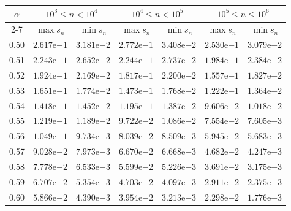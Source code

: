 \begin{table}[htb!]
\centering
\footnotesize
\begin{tabular}{|c|cc|cc|cc|}
\hline
\multirow{2}{*}{$\alpha$} & \multicolumn{2}{c|}{$10^{3} \leq n < 10^{4}$} & \multicolumn{2}{c|}{$10^{4} \leq n < 10^{5}$} & \multicolumn{2}{c|}{$10^{5} \leq n \leq 10^{6}$} \\
\cline{2-7}
 & $\max s_n$ & $\min s_n$ & $\max s_n$ & $\min s_n$ & $\max s_n$ & $\min s_n$ \\
\hline\hline
0.50 & $2.617\mathrm{e}{-1}$ & $3.181\mathrm{e}{-2}$ & $2.772\mathrm{e}{-1}$ & $3.408\mathrm{e}{-2}$ & $2.530\mathrm{e}{-1}$ & $3.079\mathrm{e}{-2}$ \\
0.51 & $2.243\mathrm{e}{-1}$ & $2.652\mathrm{e}{-2}$ & $2.244\mathrm{e}{-1}$ & $2.737\mathrm{e}{-2}$ & $1.984\mathrm{e}{-1}$ & $2.384\mathrm{e}{-2}$ \\
0.52 & $1.924\mathrm{e}{-1}$ & $2.169\mathrm{e}{-2}$ & $1.817\mathrm{e}{-1}$ & $2.200\mathrm{e}{-2}$ & $1.557\mathrm{e}{-1}$ & $1.827\mathrm{e}{-2}$ \\
0.53 & $1.651\mathrm{e}{-1}$ & $1.774\mathrm{e}{-2}$ & $1.473\mathrm{e}{-1}$ & $1.768\mathrm{e}{-2}$ & $1.222\mathrm{e}{-1}$ & $1.364\mathrm{e}{-2}$ \\
0.54 & $1.418\mathrm{e}{-1}$ & $1.452\mathrm{e}{-2}$ & $1.195\mathrm{e}{-1}$ & $1.387\mathrm{e}{-2}$ & $9.606\mathrm{e}{-2}$ & $1.018\mathrm{e}{-2}$ \\
0.55 & $1.219\mathrm{e}{-1}$ & $1.189\mathrm{e}{-2}$ & $9.722\mathrm{e}{-2}$ & $1.086\mathrm{e}{-2}$ & $7.554\mathrm{e}{-2}$ & $7.605\mathrm{e}{-3}$ \\
0.56 & $1.049\mathrm{e}{-1}$ & $9.734\mathrm{e}{-3}$ & $8.039\mathrm{e}{-2}$ & $8.509\mathrm{e}{-3}$ & $5.945\mathrm{e}{-2}$ & $5.683\mathrm{e}{-3}$ \\
0.57 & $9.028\mathrm{e}{-2}$ & $7.973\mathrm{e}{-3}$ & $6.670\mathrm{e}{-2}$ & $6.668\mathrm{e}{-3}$ & $4.682\mathrm{e}{-2}$ & $4.247\mathrm{e}{-3}$ \\
0.58 & $7.778\mathrm{e}{-2}$ & $6.533\mathrm{e}{-3}$ & $5.599\mathrm{e}{-2}$ & $5.226\mathrm{e}{-3}$ & $3.691\mathrm{e}{-2}$ & $3.175\mathrm{e}{-3}$ \\
0.59 & $6.707\mathrm{e}{-2}$ & $5.354\mathrm{e}{-3}$ & $4.703\mathrm{e}{-2}$ & $4.097\mathrm{e}{-3}$ & $2.911\mathrm{e}{-2}$ & $2.375\mathrm{e}{-3}$ \\
0.60 & $5.866\mathrm{e}{-2}$ & $4.390\mathrm{e}{-3}$ & $3.954\mathrm{e}{-2}$ & $3.213\mathrm{e}{-3}$ & $2.298\mathrm{e}{-2}$ & $1.776\mathrm{e}{-3}$ \\

\end{tabular}
\end{table}
